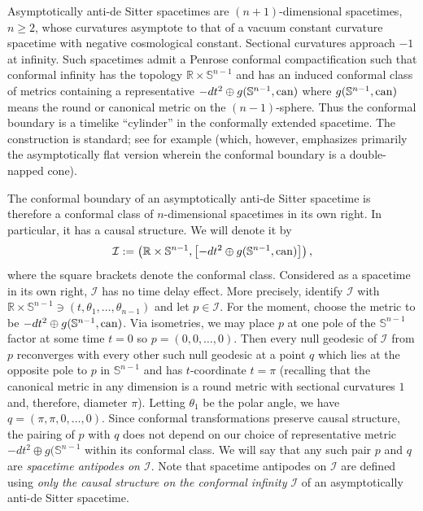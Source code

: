 \documentclass[12pt]{amsart}
\numberwithin{equation}{section}
\begin{document}
Asymptotically anti-de Sitter spacetimes are $(n+1)$-dimensional spacetimes, $n\ge 2$, whose curvatures asymptote to that of a vacuum constant curvature spacetime with negative cosmological constant. Sectional curvatures approach $-1$ at infinity. Such spacetimes admit a Penrose conformal compactification such that conformal infinity has the topology ${\mathbb R}\times {\mathbb S}^{n-1}$ and has an induced conformal class of metrics containing a representative $-dt^2\oplus g({\mathbb S}^{n-1},{\rm can})$ where $g({\mathbb S}^{n-1},{\rm can})$ means the round or canonical metric on the $(n-1)$-sphere. Thus the conformal boundary is a timelike ``cylinder'' in the conformally extended spacetime. The construction is standard; see for example \cite[Section 11.1]{Wald} (which, however, emphasizes primarily the asymptotically flat version wherein the conformal boundary is a double-napped cone).

The conformal boundary of an asymptotically anti-de Sitter spacetime is therefore a conformal class of $n$-dimensional spacetimes in its own right. In particular, it has a causal structure. We will denote it by
\begin{equation}
\label{eq1.1}
{\mathcal I}:= \left ( {\mathbb R}\times {\mathbb S}^{n-1}, \left [-dt^2\oplus g({\mathbb S}^{n-1},{\rm can}) \right ] \right ),
\end{equation}
where the square brackets denote the conformal class. Considered as a spacetime in its own right, ${\mathcal I}$ has no time delay effect. More precisely, identify ${\mathcal I}$ with ${\mathbb R}\times{\mathbb S}^{n-1}\ni (t,\theta_1,\dots,\theta_{n-1})$ and let $p\in {\mathcal I}$. For the moment, choose the metric to be $-dt^2\oplus g({\mathbb S}^{n-1},{\rm can})$. Via isometries, we may place $p$ at one pole of the ${\mathbb S}^{n-1}$ factor at some time $t=0$ so $p=(0,0,\dots,0)$. Then every null geodesic of ${\mathcal I}$ from $p$ reconverges with every other such null geodesic at a point $q$ which lies at the opposite pole to $p$ in ${\mathbb S}^{n-1}$ and has $t$-coordinate $t=\pi$ (recalling that the canonical metric in any dimension is a round metric with sectional curvatures $1$ and, therefore, diameter $\pi$). Letting $\theta_1$ be the polar angle, we have $q=(\pi,\pi,0,\dots,0)$. Since conformal transformations preserve causal structure, the pairing of $p$ with $q$ does not depend on our choice of representative metric $-dt^2\oplus g({\mathbb S}^{n-1}$ within its conformal class. We will say that any such pair $p$ and $q$ are \emph{spacetime antipodes on ${\mathcal I}$}. Note that spacetime antipodes on ${\mathcal I}$ are defined using \emph{only the causal structure on the conformal infinity ${\mathcal I}$} of an asymptotically anti-de Sitter spacetime.
\end{document}
